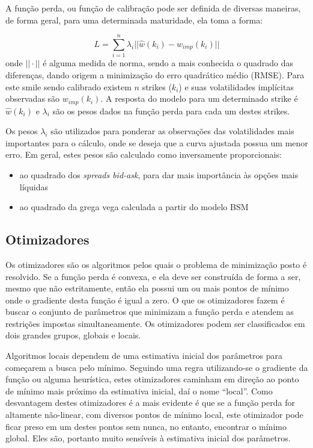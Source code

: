 \documentclass[]{book}
\providecommand{\tightlist}{%
  \setlength{\itemsep}{0pt}\setlength{\parskip}{0pt}}
\theoremstyle{definition}
\theoremstyle{definition}
\theoremstyle{definition}
\theoremstyle{remark}
\begin{document}
A função perda, ou função de calibração pode ser definida de diversas
maneiras, de forma geral, para uma determinada maturidade, ela toma a
forma:

\[L=\sum\limits_{i=1}^n\lambda_i||\hat w(k_i)-w_{imp}(k_i)||\] onde
\(||\cdot||\) é alguma medida de norma, sendo a mais conhecida o
quadrado das diferenças, dando origem a minimização do erro quadrático
médio (RMSE). Para este smile sendo calibrado existem \(n\) strikes
(\(k_i\)) e suas volatilidades implícitas observadas são
\(w_{imp}(k_i)\). A resposta do modelo para um determinado strike é
\(\hat w(k_i)\) e \(\lambda_i\) são os pesos dados na função perda para
cada um destes strikes.

Os pesos \(\lambda_i\) são utilizados para ponderar as observações das
volatilidades mais importantes para o cálculo, onde se deseja que a
curva ajustada possua um menor erro. Em geral, estes pesos são calculado
como inversamente proporcionais:

\begin{itemize}
\tightlist
\item
  ao quadrado dos \emph{spreads bid-ask}, para dar mais importância às
  opções mais líquidas
\item
  ao quadrado da grega vega calculada a partir do modelo BSM
\end{itemize}

\subsection{Otimizadores}\label{otimizadores}

Os otimizadores são os algoritmos pelos quais o problema de minimização
posto é resolvido. Se a função perda é convexa, e ela deve ser
construída de forma a ser, mesmo que não estritamente, então ela possui
um ou mais pontos de mínimo onde o gradiente desta função é igual a
zero. O que os otimizadores fazem é buscar o conjunto de parâmetros que
minimizam a função perda e atendem as restrições impostas
simultaneamente. Os otimizadores podem ser classificados em dois grandes
grupos, globais e locais.

Algoritmos locais dependem de uma estimativa inicial dos parâmetros para
começarem a busca pelo mínimo. Seguindo uma regra utilizando-se o
gradiente da função ou alguma heurística, estes otimizadores caminham em
direção ao ponto de mínimo mais próximo da estimativa inicial, daí o
nome ``local''. Como desvantagem destes otimizadores é a mais evidente é
que se a função perda for altamente não-linear, com diversos pontos de
mínimo local, este otimizador pode ficar preso em um destes pontos sem
nunca, no entanto, encontrar o mínimo global. Eles são, portanto muito
sensíveis à estimativa inicial dos parâmetros.
\end{document}
